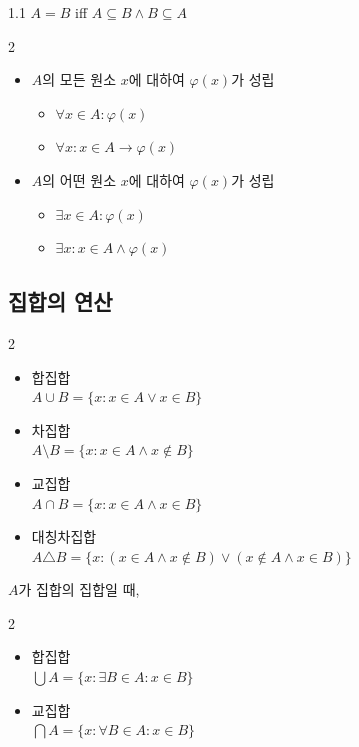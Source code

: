 \documentclass{article}
\begin{document}
\begin{prop}{}{1.1}
    $A=B$ iff $A\subseteq B\wedge B\subseteq A$
\end{prop}

\begin{multicols}{2}
\begin{itemize}
    \item $A$의 모든 원소 $x$에 대하여 $\varphi(x)$가 성립
        \begin{itemize}
            \item[$\checkmark$] $\forall x\in A:\varphi(x)$
            \item[$\checkmark$] $\forall x:x\in A\longrightarrow\varphi(x)$
        \end{itemize}
    \item $A$의 어떤 원소 $x$에 대하여 $\varphi(x)$가 성립
        \begin{itemize}
            \item[$\checkmark$] $\exists x\in A:\varphi(x)$
            \item[$\checkmark$] $\exists x:x\in A\wedge\varphi(x)$
        \end{itemize}
\end{itemize}
\end{multicols}

\subsection{집합의 연산}
\begin{multicols}{2}
    \begin{itemize}
        \item 합집합 \\
            $A\cup B=\{x:x\in A\vee x\in B\}$
        \item 차집합 \\
            $A\setminus B=\{x:x\in A\wedge x\notin B\}$
        \item 교집합 \\
            $A\cap B=\{x:x\in A\wedge x\in B\}$
        \item 대칭차집합 \\
            $A\triangle B=\{x:(x\in A\wedge x\notin B)\vee(x\notin A\wedge x\in B)\}$
    \end{itemize}
\end{multicols}

\noindent $A$가 집합의 집합일 때,
\begin{multicols}{2}
    \begin{itemize}
        \item 합집합 \\
            $\bigcup A=\{x:\exists B\in A:x\in B\}$
        \item 교집합 \\
            $\bigcap A=\{x:\forall B\in A:x\in B\}$
    \end{itemize}
\end{multicols}
\end{document}

